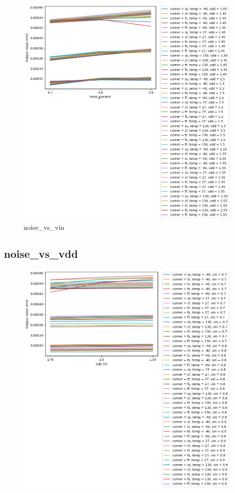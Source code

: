 \documentclass[
  a4paper,
  DIV=11,
  numbers=noendperiod]{scrartcl}
\begin{document}
\begin{tcolorbox}
\begin{figure}[H]
{\centering \includegraphics{./cace/_docs/ota-5t/schematic/noise_vs_vin.png}

}

\caption{noise\_vs\_vin}

\end{figure}%

\subsection{noise\_vs\_vdd}\label{noise_vs_vdd}

\begin{figure}[H]

{\centering \includegraphics{./cace/_docs/ota-5t/schematic/noise_vs_vdd.png}

}
\end{figure}
\end{tcolorbox}
\end{document}
